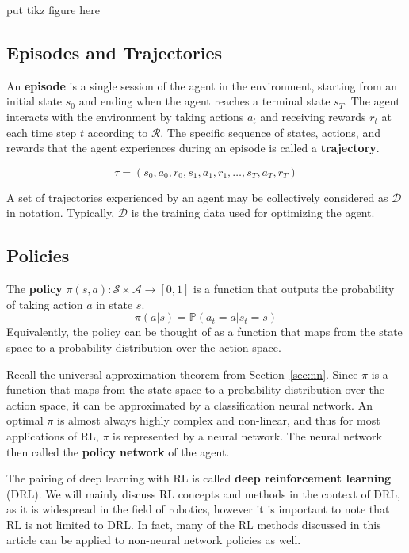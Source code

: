 \documentclass[12pt]{report}
\theoremstyle{definition}
\theoremstyle{remark}
\begin{document}
put tikz figure here

\subsection{Episodes and Trajectories}
An \textbf{episode} is a single session of the agent in the environment, starting from an initial state $s_0$ and ending when the agent reaches a terminal state $s_T$. The agent interacts with the environment by taking actions $a_t$ and receiving rewards $r_t$ at each time step $t$ according to $\mathcal{R}$. The specific sequence of states, actions, and rewards that the agent experiences during an episode is called a \textbf{trajectory}.

\begin{equation}
    \tau = (s_0, a_0, r_0, s_1, a_1, r_1, \ldots, s_T, a_T, r_T)
\end{equation}

A set of trajectories experienced by an agent may be collectively considered as $\mathcal{D}$ in notation. Typically, $\mathcal{D}$ is the training data used for optimizing the agent.

\subsection{Policies}

The \textbf{policy} $\pi(s, a): \mathcal{S} \times \mathcal{A} \to [0,1]$ is a function that outputs the probability of taking action $a$ in state $s$.
\begin{equation}
    \pi(a | s) = \mathbb{P}(a_t = a | s_t = s)
\end{equation}
Equivalently, the policy can be thought of as a function that maps from the state space to a probability distribution over the action space.

Recall the universal approximation theorem from Section~\ref{sec:nn}. Since $\pi$ is a function that maps from the state space to a probability distribution over the action space, it can be approximated by a classification neural network. An optimal $\pi$ is almost always highly complex and non-linear, and thus for most applications of RL, $\pi$ is represented by a neural network. The neural network then called the \textbf{policy network} of the agent.

The pairing of deep learning with RL is called \textbf{deep reinforcement learning} (DRL). We will mainly discuss RL concepts and methods in the context of DRL, as it is widespread in the field of robotics, however it is important to note that RL is not limited to DRL\@. In fact, many of the RL methods discussed in this article can be applied to non-neural network policies as well.
\end{document}
